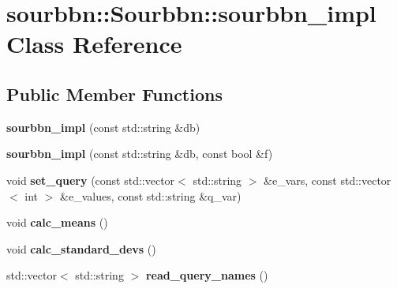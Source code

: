 \hypertarget{classsourbbn_1_1Sourbbn_1_1sourbbn__impl}{}\section{sourbbn\+:\+:Sourbbn\+:\+:sourbbn\+\_\+impl Class Reference}
\label{classsourbbn_1_1Sourbbn_1_1sourbbn__impl}
\subsection*{Public Member Functions}
\begin{DoxyCompactItemize}
\item 
\mbox{\label{classsourbbn_1_1Sourbbn_1_1sourbbn__impl_a484eb4c7d19ce9103421d67e90fad435}} 
{\bfseries sourbbn\+\_\+impl} (const std\+::string \&db)
\item 
\mbox{\label{classsourbbn_1_1Sourbbn_1_1sourbbn__impl_a7949e70107154faa68e0d750f6c82a63}} 
{\bfseries sourbbn\+\_\+impl} (const std\+::string \&db, const bool \&f)
\item 
\mbox{\label{classsourbbn_1_1Sourbbn_1_1sourbbn__impl_a74aa49c297b0b355fe07351597430536}} 
void {\bfseries set\+\_\+query} (const std\+::vector$<$ std\+::string $>$ \&e\+\_\+vars, const std\+::vector$<$ int $>$ \&e\+\_\+values, const std\+::string \&q\+\_\+var)
\item 
\mbox{\label{classsourbbn_1_1Sourbbn_1_1sourbbn__impl_a2ba036e52ad78c6915737602c2f4b134}} 
void {\bfseries calc\+\_\+means} ()
\item 
\mbox{\label{classsourbbn_1_1Sourbbn_1_1sourbbn__impl_ab35681b53975e710c41a014cb91ef096}} 
void {\bfseries calc\+\_\+standard\+\_\+devs} ()
\item 
\mbox{\label{classsourbbn_1_1Sourbbn_1_1sourbbn__impl_a0f8309a5c3f3efca3e271e292ad18698}} 
std\+::vector$<$ std\+::string $>$ {\bfseries read\+\_\+query\+\_\+names} ()
\item 
\mbox{\label{classsourbbn_1_1Sourbbn_1_1sourbbn__impl_aa3c5d7fa6c064e8fbe833d1fe0e21c27}} 

\end{DoxyCompactItemize}
